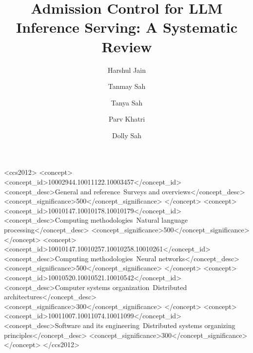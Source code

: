 \documentclass[acmsmall,review,anonymous]{acmart}
\begin{document}
\title{Admission Control for LLM Inference Serving: A Systematic Review}

\author{Harshul Jain}
\author{Tanmay Sah}
\author{Tanya Sah}
\author{Parv Khatri}
\author{Dolly Sah}

\renewcommand{\shortauthors}{Jain et al.}

\makeatletter
\if@ACM@anonymous
  \newcommand{\artifacturl}{repository withheld for anonymous review;
    the coding sheets are included as supplementary material}
\else
  \newcommand{\artifacturl}{included as supplementary material with this article}
\fi
\makeatother



\begin{CCSXML}
<ccs2012>
<concept>
   <concept_id>10002944.10011122.10003457</concept_id>
   <concept_desc>General and reference~Surveys and overviews</concept_desc>
   <concept_significance>500</concept_significance>
</concept>
<concept>
   <concept_id>10010147.10010178.10010179</concept_id>
   <concept_desc>Computing methodologies~Natural language processing</concept_desc>
   <concept_significance>500</concept_significance>
</concept>
<concept>
   <concept_id>10010147.10010257.10010258.10010261</concept_id>
   <concept_desc>Computing methodologies~Neural networks</concept_desc>
   <concept_significance>500</concept_significance>
</concept>
<concept>
   <concept_id>10010520.10010521.10010542</concept_id>
   <concept_desc>Computer systems organization~Distributed architectures</concept_desc>
   <concept_significance>300</concept_significance>
</concept>
<concept>
   <concept_id>10011007.10011074.10011099</concept_id>
   <concept_desc>Software and its engineering~Distributed systems organizing principles</concept_desc>
   <concept_significance>300</concept_significance>
</concept>
</ccs2012>
\end{CCSXML}
\end{document}
